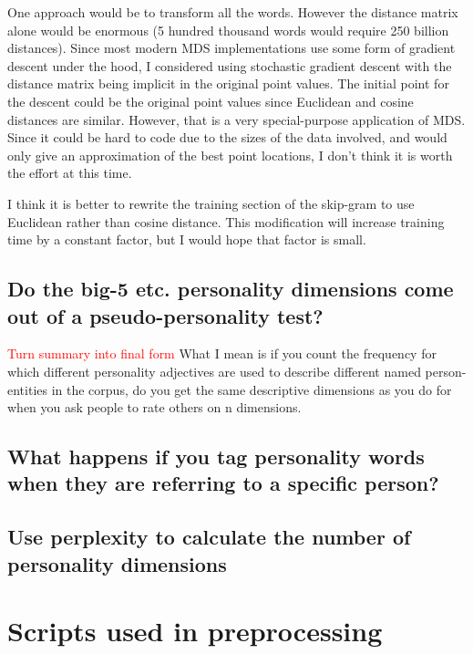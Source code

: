 \documentclass[10pt,letterpaper]{book}
\newcommand{\todo}[1]{\textcolor{red}{#1}}
\begin{document}
One approach would be to transform all the words. However the distance matrix alone would be enormous (5 hundred thousand words would require 250 billion distances). Since most modern MDS implementations use some form of gradient descent under the hood, I considered using stochastic gradient descent with the distance matrix being implicit in the original point values. The initial point for the descent could be the original point values since Euclidean and cosine distances are similar. However, that is a very special-purpose application of MDS. Since it could be hard to code due to the sizes of the data involved, and would only give an approximation of the best point locations, I don't think it is worth the effort at this time.

I think it is better to rewrite the training section of the skip-gram to use Euclidean rather than cosine distance. This modification will increase training time by a constant factor, but I would hope that factor is small.

\section{Do the big-5 etc. personality dimensions come out of a pseudo-personality test?}
\todo{Turn summary into final form}
What I mean is if you count the frequency for which different personality adjectives are used to describe different named person-entities in the corpus, do you get the same descriptive dimensions as you do for when you ask people to rate others on n dimensions.

\section{What happens if you tag personality words when they are referring to a specific person?}

\section{Use perplexity to calculate the number of personality dimensions}

\appendix
\chapter{Scripts used in preprocessing}
\end{document}
